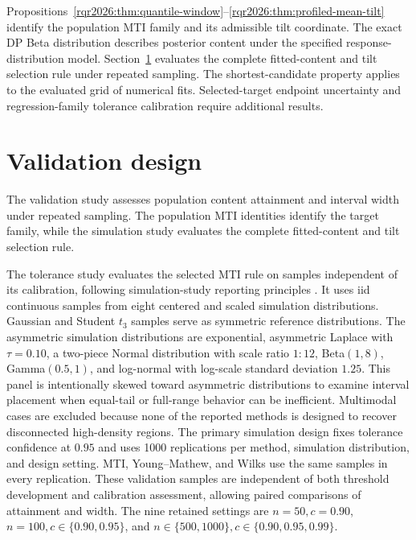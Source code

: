 Propositions~\ref{rqr2026:thm:quantile-window}--\ref{rqr2026:thm:profiled-mean-tilt} identify
the population MTI family and its admissible tilt coordinate. The exact DP
Beta distribution describes posterior content under the specified
response-distribution model. Section~\ref{rqr2026:sec:evaluation} evaluates the
complete fitted-content and tilt selection rule under repeated sampling. The
shortest-candidate property applies to the evaluated grid of numerical fits.
Selected-target endpoint uncertainty and regression-family tolerance
calibration require additional results.

\section{Validation design}
\label{rqr2026:sec:evaluation}

The validation study assesses population content attainment and interval width
under repeated sampling. The population MTI identities identify the target
family, while the simulation study evaluates the complete fitted-content and
tilt selection rule.

The tolerance study evaluates the selected MTI rule on samples independent
of its calibration, following simulation-study reporting principles
\citep{rqr-MorrisWhiteCrowther2019Simulation}. It uses iid continuous samples from
eight centered and scaled simulation distributions. Gaussian and Student \(t_3\)
samples serve as symmetric reference distributions. The asymmetric simulation
distributions are exponential,
asymmetric Laplace with \(\tau=0.10\), a two-piece Normal distribution with scale ratio
\(1{:}12\), Beta\((1,8)\), Gamma\((0.5,1)\), and log-normal with log-scale
standard deviation \(1.25\). This panel is intentionally skewed toward
asymmetric distributions to examine interval placement when equal-tail or full-range
behavior can be inefficient.
Multimodal cases are excluded because none of the reported methods is designed
to recover disconnected high-density regions.
The primary simulation design fixes tolerance confidence at \(0.95\) and uses
1000 replications per method, simulation distribution, and design setting.
MTI, Young--Mathew, and Wilks use the same samples in every replication.
These validation samples are independent of both threshold development and
calibration assessment, allowing paired comparisons of attainment and width.
The nine retained settings are \(n=50,c=0.90\),
\(n=100,c\in\{0.90,0.95\}\), and
\(n\in\{500,1000\},c\in\{0.90,0.95,0.99\}\).

